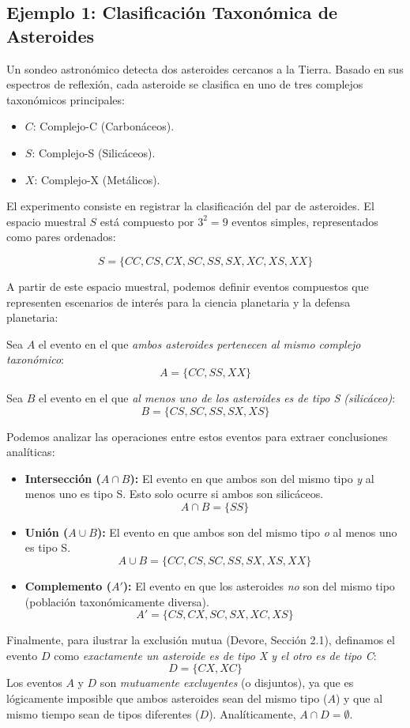 \subsection{Ejemplo 1: Clasificación Taxonómica de Asteroides}

Un sondeo astronómico detecta dos asteroides cercanos a la Tierra. Basado en sus espectros de reflexión, cada asteroide se clasifica en uno de tres complejos taxonómicos principales:
\begin{itemize}
    \item $C$: Complejo-C (Carbonáceos).
    \item $S$: Complejo-S (Silicáceos).
    \item $X$: Complejo-X (Metálicos).
\end{itemize}

El experimento consiste en registrar la clasificación del par de asteroides. El espacio muestral $S$ está compuesto por $3^2 = 9$ eventos simples, representados como pares ordenados:


$$ S = \{CC, CS, CX, SC, SS, SX, XC, XS, XX\} $$

A partir de este espacio muestral, podemos definir eventos compuestos que representen escenarios de interés para la ciencia planetaria y la defensa planetaria:

Sea $A$ el evento en el que \textit{ambos asteroides pertenecen al mismo complejo taxonómico}:
$$ A = \{CC, SS, XX\} $$

Sea $B$ el evento en el que \textit{al menos uno de los asteroides es de tipo S (silicáceo)}:
$$ B = \{CS, SC, SS, SX, XS\} $$

Podemos analizar las operaciones entre estos eventos para extraer conclusiones analíticas:
\begin{itemize}
    \item \textbf{Intersección ($A \cap B$):} El evento en que ambos son del mismo tipo \textit{y} al menos uno es tipo S. Esto solo ocurre si ambos son silicáceos.
    $$ A \cap B = \{SS\} $$
    \item \textbf{Unión ($A \cup B$):} El evento en que ambos son del mismo tipo \textit{o} al menos uno es tipo S.
    $$ A \cup B = \{CC, CS, SC, SS, SX, XS, XX\} $$
    \item \textbf{Complemento ($A'$):} El evento en que los asteroides \textit{no} son del mismo tipo (población taxonómicamente diversa).
    $$ A' = \{CS, CX, SC, SX, XC, XS\} $$
\end{itemize}

Finalmente, para ilustrar la exclusión mutua (Devore, Sección 2.1), definamos el evento $D$ como \textit{exactamente un asteroide es de tipo X y el otro es de tipo C}:
$$ D = \{CX, XC\} $$
Los eventos $A$ y $D$ son \textit{mutuamente excluyentes} (o disjuntos), ya que es lógicamente imposible que ambos asteroides sean del mismo tipo ($A$) y que al mismo tiempo sean de tipos diferentes ($D$). Analíticamente, $A \cap D = \emptyset$.

